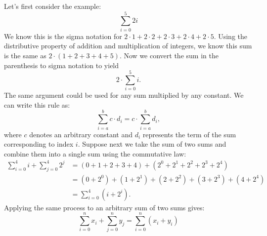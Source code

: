 Let's first consider the example:
\[\sum_{i=0}^{5}2i\]
We know this is the sigma notation for $2\cdot1+2\cdot2+2\cdot3+2\cdot4+2\cdot5$. Using the distributive property of addition and multiplication of integers, we know this sum is the same as $2\cdot(1+2+3+4+5)$.  Now we convert the sum in the parenthesis to sigma notation to yield
\[2\cdot\sum_{i=0}^{5}i.\]
The same argument could be used for any sum  multiplied by any constant. We can write this rule as:
\begin{equation}
\sum_{i=a}^{b} c \cdot d_i = c \cdot \sum_{i=a}^{b}  d_i,
\end{equation}
where $c$ denotes an arbitrary constant and $d_i$ represents the term of the sum corresponding to index $i$.
Suppose next we take the sum of two sums and combine them into a single sum using the commutative law:
\begin{align*}
\sum_{i=0}^4 i + \sum_{j=0}^4 2^j &=  (0+1+2+3+4) + (2^0 + 2^1 + 2^2 + 2^3 + 2^4)\\
&= (0+2^0) + (1+2^1) + (2+2^2) + (3+2^3) + (4+2^4) \\
&= \sum_{i=0}^4 (i + 2^i).
\end{align*}
Applying the same process to an arbitrary sum of two sums gives:
\begin{equation}\label{eq:combineSums}
    \sum_{i=0}^n x_i + \sum_{j=0}^n y_j
    =\sum_{i=0}^n (x_i + y_i)
\end{equation}

